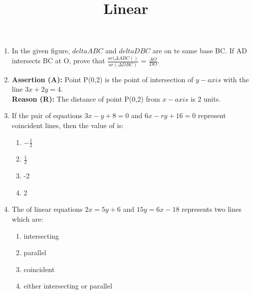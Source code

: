 \documentclass{article}
\begin{document}
\begin{enumerate}
		\newpage

	\item In the given figure, $deltaABC$ and $deltaDBC$ are on te same base BC. If AD intersects BC at O, prove that $\frac {ar (\Delta ABC()}{ar (\Delta DBC)}$ = $\frac{AO}{DO}$.

		\begin{center}
		\end{center}

\pagebreak

\title{\textbf{Linear}}
\date{}
\maketitle

	\item \textbf{Assertion (A):} Point P(0,2) is the point of intersection of $y-axis$ with  the line $3x+2y=4$.\\
		\textbf{Reason (R):} The distance of point P(0,2) from $x-axis$ is 2 units.


	\item If the pair of equations $3x-y+8=0$ and $6x-ry+16=0$ represent coincident lines, then the value of  is:

		\begin{enumerate}
			\item $-\frac{1}{2}$
			\item $\frac{1}{2}$
			\item -2
			\item 2
		\end{enumerate}

	\item The of linear equations $2x=5y+6$ and $15y=6x-18$ represents two lines which are:

			\begin{enumerate}
				\item intersecting
				\item parallel
				\item coincident
				\item either intersecting or parallel
			\end{enumerate}


\end{enumerate}
\end{document}
